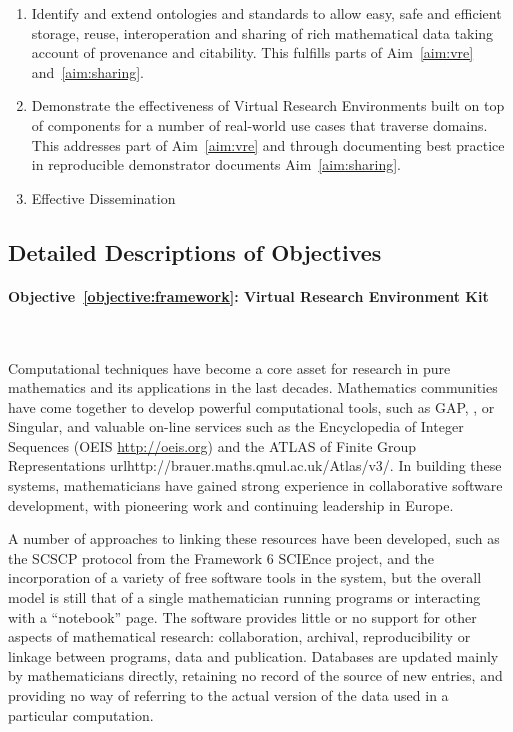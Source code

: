 \documentclass[noworkareas,deliverables,\classoptions]{euproposal}       %
\begin{document}
\begin{proposal}
\begin{enumerate}
\item \label{objective:data} Identify and extend ontologies and
  standards to allow easy, safe and efficient storage, reuse,
  interoperation and sharing of rich mathematical data taking account
  of provenance and citability. This fulfills parts of
  Aim~\ref{aim:vre} and~\ref{aim:sharing}. 

\item \label{objective:demo}Demonstrate the effectiveness of Virtual
  Research Environments built on top of \TheProject components for a
  number of real-world use cases that traverse domains. This addresses
  part of Aim~\ref{aim:vre} and through documenting best practice in
  reproducible demonstrator documents Aim~\ref{aim:sharing}.

\item \label{objective:disseminate}Effective Dissemination

\end{enumerate}

\subsection*{Detailed Descriptions of Objectives} %

\paragraph{Objective~\ref{objective:framework}: Virtual Research
  Environment Kit}\ 

Computational techniques have become a core asset for research in pure
mathematics and its applications in the last decades. Mathematics
communities have come together to develop powerful computational
tools, such as GAP, \PariGP, \Sage or Singular, and valuable on-line
services such as the Encyclopedia of Integer Sequences (OEIS
\url{http://oeis.org}) and the ATLAS of Finite Group Representations
url{http://brauer.maths.qmul.ac.uk/Atlas/v3/}. In building these
systems, mathematicians have gained strong experience in collaborative
software development, with pioneering work and continuing leadership
in Europe.

A number of approaches to linking these resources have been developed,
such as the SCSCP protocol from the Framework 6 SCIEnce project, and
the incorporation of a variety of free software tools in the \Sage 
system, but the overall model is still that of a single mathematician
running programs or interacting with a ``notebook''
page. The software provides little or no support for other aspects of
mathematical research: collaboration,
archival, reproducibility or linkage between programs, data and
publication. Databases are updated mainly by mathematicians directly,
retaining no record of the source of new entries, and providing no way
of referring to the actual version of the data used in a particular
computation.


\end{proposal}
\end{document}
